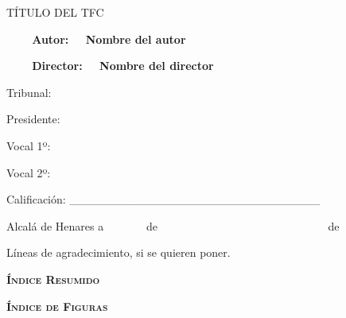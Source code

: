 \documentclass[a4paper]{article}
\newcounter{Figura}
\begin{document}
{\centering\scshape
TÍTULO DEL TFC
\par}


\bigskip

{
{\textbf{\ \ \ \ Autor}}{\textbf{: \ \ Nombre del autor}}}

{
{\textbf{\ \ \ \ Director: \ \ }}{\textbf{Nombre del director}}}


\bigskip


\bigskip

{
Tribunal:}

{
Presidente: }


\bigskip


\bigskip

{
{Vocal 1º}{: }}


\bigskip


\bigskip

{
Vocal 2º: }


\bigskip

{
{Calificación: }\_\_\_\_\_\_\_\_\_\_\_\_\_\_\_\_\_\_\_\_\_\_\_\_\_\_\_\_\_\_}

{
{Alcalá de Henares a}{ \ \ \ \ \ \ \ de \ \ \ \ \ \ \ \ \ \ \ \ \ \ \ \ \ \ \ \ \ \ \ \ \ \ \ \ \ \ de \ \ \ }}

\clearpage
\bigskip

\clearpage
\bigskip


\bigskip


\bigskip


\bigskip


\bigskip

{
Líneas de agradecimiento, si se quieren poner.}


\bigskip

\clearpage
\bigskip

\clearpage\setcounter{page}{1}\pagestyle{Convertiri}
{\bfseries\scshape
Índice Resumido}


\bigskip

\setcounter{tocdepth}{9}
\renewcommand\contentsname{}
\tableofcontents

\bigskip

\clearpage
\bigskip


\bigskip



\bigskip
\setcounter{tocdepth}{9}
\renewcommand\contentsname{}
\tableofcontents

\bigskip


\bigskip

\clearpage
\bigskip

{\bfseries\scshape
Índice de Figuras}
\end{document}
